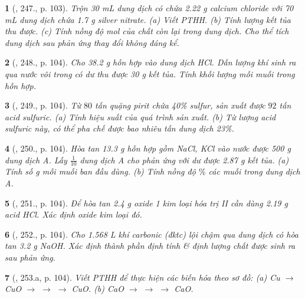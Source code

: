 \documentclass{article}
\newtheorem{baitoan}{}
\begin{document}
\begin{baitoan}[\cite{Nguyen_Buu_Can_500_BT_Hoa_Hoc_THCS}, 247., p. 103]
	Trộn {\rm30 mL} dung dịch có chứa {\rm2.22 g} calcium chloride với {\rm70 mL} dung dịch chứa {\rm1.7 g} silver nitrate. (a) Viết {\rm PTHH}. (b) Tính lượng kết tủa thu được. (c) Tính nồng độ mol của chất còn lại trong dung dịch. Cho thể tích dung dịch sau phản ứng thay đổi không đáng kể.
\end{baitoan}

\begin{baitoan}[\cite{Nguyen_Buu_Can_500_BT_Hoa_Hoc_THCS}, 248., p. 104]
	Cho {\rm38.2 g} hỗn hợp {\rm{}} vào dung dịch {\rm HCl}. Dẫn lượng khí sinh ra qua nước vôi trong có dư thu được {\rm30 g} kết tủa. Tính khối lượng mỗi muối trong hỗn hợp.
\end{baitoan}

\begin{baitoan}[\cite{Nguyen_Buu_Can_500_BT_Hoa_Hoc_THCS}, 249., p. 104]
	Từ $80$ tấn quặng pirit chứa {\rm40\%} sulfur, sản xuất được $92$ tấn acid sulfuric. (a) Tính hiệu suất của quá trình sản xuất. (b) Từ lượng acid sulfuric này, có thể pha chế được bao nhiêu tấn dung dịch {\rm{} 23\%}.
\end{baitoan}

\begin{baitoan}[\cite{Nguyen_Buu_Can_500_BT_Hoa_Hoc_THCS}, 250., p. 104]
	Hòa tan {\rm13.3 g} hỗn hợp gồm {\rm NaCl, KCl} vào nước được {\rm500 g} dung dịch A. Lấy $\frac{1}{10}$ dung dịch A cho phản ứng với {\rm{}} dư được {\rm2.87 g} kết tủa. (a) Tính số {\rm g} mỗi muối ban đầu dùng. (b) Tính nồng độ $\%$ các muối trong dung dịch A.
\end{baitoan}

\begin{baitoan}[\cite{Nguyen_Buu_Can_500_BT_Hoa_Hoc_THCS}, 251., p. 104]
	Để hòa tan {\rm2.4 g} oxide 1 kim loại hóa trị {\rm II} cần dùng {\rm2.19 g} acid {\rm HCl}. Xác định oxide kim loại đó.
\end{baitoan}

\begin{baitoan}[\cite{Nguyen_Buu_Can_500_BT_Hoa_Hoc_THCS}, 252., p. 104]
	Cho {\rm1.568 L} khí carbonic (đktc) lội chậm qua dung dịch có hòa tan {\rm3.2 g NaOH}. Xác định thành phần định tính \& định lượng chất được sinh ra sau phản ứng.
\end{baitoan}

\begin{baitoan}[\cite{Nguyen_Buu_Can_500_BT_Hoa_Hoc_THCS}, 253.a, p. 104]
	Viết {\rm PTHH} để thực hiện các biến hóa theo sơ đồ: {\rm(a) Cu $\to$ CuO $\to$  $\to$  $\to$ CuO. (b) CaO $\to$  $\to$  $\to$ CaO}.
\end{baitoan}
\end{document}
